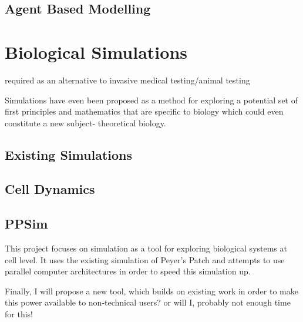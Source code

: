 \documentclass{UoYCSproject}
\begin{document}


\subsection{Agent Based Modelling}

\section{Biological Simulations}
required as an alternative to invasive medical testing/animal testing


Simulations have even been proposed as a method for exploring a potential set of first principles and mathematics that are specific to biology which could even constitute a new subject- theoretical biology\cite{rise_article}.

\subsection{Existing Simulations}

\subsection{Cell Dynamics}


\subsection{PPSim}
This project focuses on simulation as a tool for exploring biological systems at cell level. It uses the existing simulation of Peyer's Patch\cite{kieran_thesis} and attempts to use parallel computer architectures in order to speed this simulation up.

Finally, I will propose a new tool, which builds on existing work in order to make this power available to non-technical users? or will I, probably not enough time for this!
\end{document}
